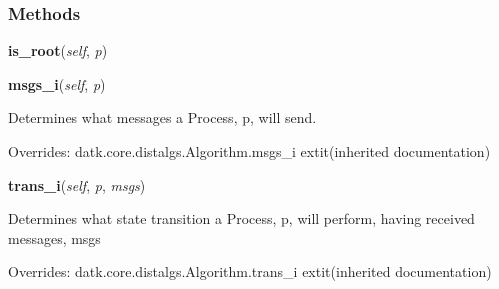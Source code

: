   \subsubsection{Methods}

    \label{datk:core:algs:AsynchConvergecast:is_root}

    \vspace{0.5ex}

\hspace{.8\funcindent}\begin{boxedminipage}{\funcwidth}

    \raggedright \textbf{is\_root}(\textit{self}, \textit{p})

\setlength{\parskip}{2ex}
\setlength{\parskip}{1ex}
    \end{boxedminipage}

    \vspace{0.5ex}

\hspace{.8\funcindent}\begin{boxedminipage}{\funcwidth}

    \raggedright \textbf{msgs\_i}(\textit{self}, \textit{p})

\setlength{\parskip}{2ex}
    Determines what messages a Process, p, will send.

\setlength{\parskip}{1ex}
      Overrides: datk.core.distalgs.Algorithm.msgs\_i 	extit{(inherited documentation)}

    \end{boxedminipage}

    \vspace{0.5ex}

\hspace{.8\funcindent}\begin{boxedminipage}{\funcwidth}

    \raggedright \textbf{trans\_i}(\textit{self}, \textit{p}, \textit{msgs})

\setlength{\parskip}{2ex}
    Determines what state transition a Process, p, will perform, having 
    received messages, msgs

\setlength{\parskip}{1ex}
      Overrides: datk.core.distalgs.Algorithm.trans\_i 	extit{(inherited documentation)}

    \end{boxedminipage}

